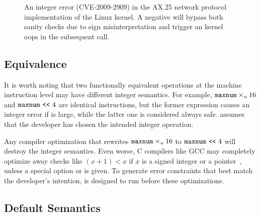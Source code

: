 \begin{figure}
\centering

\vspace{-1em}
\caption{An integer error (CVE-2009-2909) in the AX.25
network protocol implementation of the Linux kernel.  A negative
 will bypass both sanity checks due to sign misinterpretation
 and trigger an kernel
oops in the subsequent  call.}
\label{f:ax25-sign}
\end{figure}

\subsection{Equivalence}
\label{s:sema:eqv}

It is worth noting that two functionally equivalent operations at
the machine instruction level may have different integer semantics.
For example, $\texttt{maxnum}\times_u 16$ and $\texttt{maxnum} \ \texttt{<}\texttt{<}\  4$ are
identical instructions, but the former expression causes an integer
error if  is large, while the latter one is considered
always safe.  \sys assumes that the developer has chosen the
intended integer operation.

Any compiler optimization that rewrites
$\texttt{maxnum}\times_u 16$ to $\texttt{maxnum} \ \texttt{<}\texttt{<}\  4$ will destroy the
integer semantics.  Even worse, C compilers like GCC may completely
optimize away checks like $(x + 1) < x$ if $x$ is a signed integer
or a pointer~\cite{gcc:signed-overflow,us-cert:gcc}, unless a special
option  or  is
given.  To generate error constraints that best match the developer's
intention, \sys is designed to run before these optimizations.

\subsection{Default Semantics}
\label{s:sema:def}

